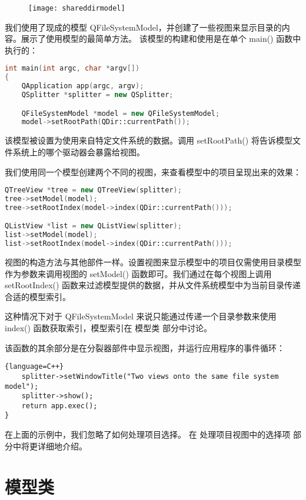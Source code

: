 \begin{figure}[hpt!]  
	\centering
    \texttt{[image: shareddirmodel]}
\end{figure}

我们使用了现成的模型 QFileSystemModel，并创建了一些视图来显示目录的内容。展示了使用模型的最简单方法。 该模型的构建和使用是在单个 main() 函数中执行的：

\begin{lstlisting}[language=C++]
int main(int argc, char *argv[])
{
    QApplication app(argc, argv);
    QSplitter *splitter = new QSplitter;

    QFileSystemModel *model = new QFileSystemModel;
    model->setRootPath(QDir::currentPath());
\end{lstlisting}

该模型被设置为使用来自特定文件系统的数据。调用 setRootPath() 将告诉模型文件系统上的哪个驱动器会暴露给视图。

我们使用同一个模型创建两个不同的视图，来查看模型中的项目呈现出来的效果：

\begin{lstlisting}[language=C++]
QTreeView *tree = new QTreeView(splitter);
tree->setModel(model);
tree->setRootIndex(model->index(QDir::currentPath()));

QListView *list = new QListView(splitter);
list->setModel(model);
list->setRootIndex(model->index(QDir::currentPath()));
\end{lstlisting}

视图的构造方法与其他部件一样。设置视图来显示模型中的项目仅需使用目录模型作为参数来调用视图的 setModel() 函数即可。我们通过在每个视图上调用 setRootIndex() 函数来过滤模型提供的数据，并从文件系统模型中为当前目录传递合适的模型索引。

这种情况下对于 QFileSystemModel 来说只能通过传递一个目录参数来使用 index() 函数获取索引，模型索引在 模型类 部分中讨论。

该函数的其余部分是在分裂器部件中显示视图，并运行应用程序的事件循环：

\begin{lstlisting}{language=C++}
    splitter->setWindowTitle("Two views onto the same file system model");
    splitter->show();
    return app.exec();
}
\end{lstlisting}

在上面的示例中，我们忽略了如何处理项目选择。 在 处理项目视图中的选择项 部分中将更详细地介绍。

\section{模型类}

